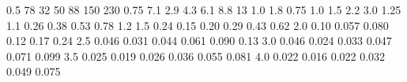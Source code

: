 0.5  78  32  50  88  150  230 
0.75  7.1  2.9  4.3  6.1  8.8  13 
1.0  1.8  0.75  1.0  1.5  2.2  3.0 
1.25  1.1  0.26  0.38  0.53  0.78  1.2 
1.5  0.24  0.15  0.20  0.29  0.43  0.62 
2.0  0.10  0.057  0.080  0.12  0.17  0.24 
2.5  0.046  0.031  0.044  0.061  0.090  0.13 
3.0  0.046  0.024  0.033  0.047  0.071  0.099 
3.5  0.025  0.019  0.026  0.036  0.055  0.081 
4.0  0.022  0.016  0.022  0.032  0.049  0.075 
